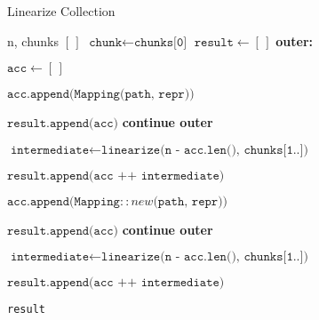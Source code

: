 \documentclass[a4paper, 16pt, oneside]{Thesis}
\begin{document}
\begin{algorithm}
    \caption{Linearize Collection}\label{alg:lin}
    \begin{algorithmic}[1]
       {n, chunks}
            \State \Return $[\,]$
        \EndIf
        \State $\texttt{chunk} \gets \texttt{chunks[0]}$
        \State $\texttt{result} \gets [\,]$
        \State
        \State \textbf{outer:} 

          \State $\texttt{acc} \gets [\,]$

            \State $\texttt{acc.append(Mapping(path, repr))}$

              \State $\texttt{result.append(acc)}$
              \State \textbf{continue outer}
            \EndIf
          \EndFor

          \State

          \State $\texttt{intermediate} \gets \texttt{linearize(n - acc.len(), chunks[1..])}$

            \State $\texttt{result.append(acc ++ intermediate)}$
          \EndFor 

          \State

            \State $\texttt{acc.append($\texttt{Mapping}::new$(path, repr))}$

              \State $\texttt{result.append(acc)}$
              \State \textbf{continue outer}
            \EndIf

            \State

            \State $\texttt{intermediate} \gets \texttt{linearize(n - acc.len(), chunks[1..])}$

              \State $\texttt{result.append(acc ++ intermediate)}$
            \EndFor 
          \EndFor


        \EndFor

        \State \Return \texttt{result}
        
      \EndFunction
    \end{algorithmic}
\end{algorithm}
\end{document}
